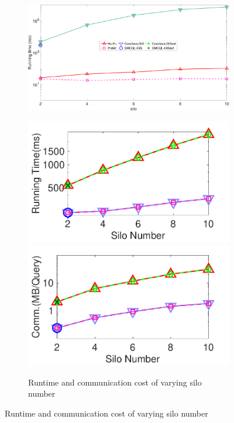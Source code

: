 \begin{figure}[t]
    \centering
    \begin{subfigure}{0.30\textwidth}
        \centering
        \includegraphics[width=\textwidth]{legend.pdf}
    \end{subfigure}
    \begin{subfigure}{0.48\textwidth}
        \centering
        \includegraphics[width=0.48\linewidth]{dj_silo_time.pdf}
        \includegraphics[width=0.48\linewidth]{dj_silo_cost.pdf}
        \caption{Runtime and communication cost of varying silo number}
        \label{fig:djoin-eff-silo-n}
    \end{subfigure}
    

\end{figure}
